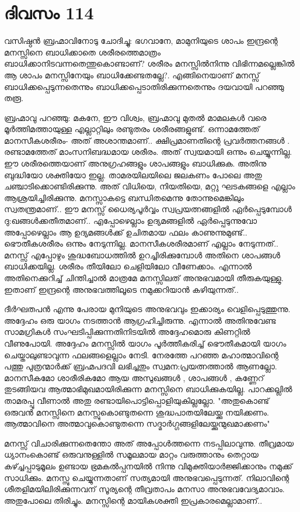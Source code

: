 \newpage
\section{ദിവസം 114}


വസിഷ്ഠന്‍ ബ്രഹ്മാവിനോടു ചോദിച്ചു: ഭഗവാനേ, മാമുനിയുടെ ശാപം ഇന്ദ്രന്റെ മനസ്സിനെ ബാധിക്കാതെ ശരീരത്തെമാത്രം ബാധിക്കാനിടവന്നതെന്തുകൊണ്ടാണ്‌? ശരീരം മനസ്സില്‍നിന്നു വിഭിന്നമല്ലെങ്കില്‍ ആ ശാപം മനസ്സിനേയും ബാധിക്കേണ്ടതല്ലേ?. എങ്ങിനെയാണ്‌ മനസ്സ്‌ ബാധിക്കപ്പെടുന്നതെന്നും ബാധിക്കപ്പെടാതിരിക്കുന്നതെന്നും ദയവായി പറഞ്ഞു തരൂ.

ബ്രഹ്മാവു പറഞ്ഞു: മകനേ, ഈ വിശ്വം, ബ്രഹ്മാവു മുതല്‍ മാമലകള്‍ വരെ മൂര്‍ത്തിമത്തായുള്ള എല്ലാറ്റിലും രണ്ടുതരം ശരീരങ്ങളുണ്ട്‌. ഒന്നാമത്തേത്‌ മാനസീകശരീരം- അത്‌ അശാന്തമാണ്‌.. ക്ഷിപ്രമാണതിന്റെ പ്രവര്‍ത്തനങ്ങള്‍ . രണ്ടാമത്തേത്‌ മാംസനിബദ്ധമായ ശരീരം. അത്‌ സ്വയമായി ഒന്നും ചെയ്യുന്നില്ല. ഈ ശരീരത്തെയാണ്‌ അനുഗ്രഹങ്ങളും ശാപങ്ങളും ബാധിക്കുക. അതിനു ബുദ്ധിയോ ശക്തിയോ ഇല്ല. താമരയിലയിലെ ജലകണം പോലെ അതു ചഞ്ചാടിക്കൊണ്ടിരിക്കുന്നു. അത്‌ വിധിയെ, നിയതിയെ, മറ്റു ഘടകങ്ങളെ എല്ലാം ആശ്രയിച്ചിരിക്കുന്നു. മനസ്സാകട്ടെ ബന്ധിതമെന്നു തോന്നുമെങ്കിലും സ്വതന്ത്രമാണ്‌.. ഈ മനസ്സ്‌ ധൈര്യപൂര്‍വ്വം സ്വപ്രയത്നങ്ങളില്‍ ഏര്‍പ്പെടുമ്പോള്‍ ദു:ഖങ്ങള്‍ക്കതീതമാണ്‌.. എപ്പോഴെല്ലാം ഉദ്യമങ്ങളില്‍ ഏര്‍പ്പെടുന്നുവോ അപ്പോഴെല്ലാം ആ ഉദ്യമങ്ങള്‍ക്ക്‌ ഉചിതമായ ഫലം കാണുന്നുമുണ്ട്‌.. ഭൌതീകശരീരം ഒന്നും നേടുന്നില്ല. മാനസീകശരീരമാണ്‌ എല്ലാം നേടുന്നത്‌.. മനസ്സ്‌ എപ്പോഴും ശുദ്ധബോധത്തില്‍ ഉറച്ചിരിക്കുമ്പോള്‍ അതിനെ ശാപങ്ങള്‍ ബാധിക്കയില്ല. ശരീരം തീയിലോ ചെളിയിലോ വീണേക്കാം. എന്നാല്‍ അതിനെക്കുറിച്ച്‌ ചിന്തിച്ചാല്‍ മാത്രമേ മനസ്സിലത് അനുഭവമായി തീരുകയുള്ളു. ഇതാണ്‌ ഇന്ദ്രന്റെ അനുഭവത്തിലൂടെ നമുക്കറിയാന്‍ കഴിയുന്നത്‌..

ദീര്‍ഘതപന്‍ എന്നു പേരായ മുനിയുടെ അനുഭവവും ഇക്കാര്യം വെളിപ്പെടുത്തുന്നു. അദ്ദേഹം ഒരു യാഗം നടത്താന്‍ ആഗ്രഹിച്ചിരുന്നു. എന്നാല്‍ അതിനുവേണ്ട സാമഗ്രികള്‍ സംഘടിപ്പിക്കുന്നതിനിടയില്‍ അദ്ദേഹമൊരു കിണറ്റില്‍ വീണുപോയി. അദ്ദേഹം മനസ്സില്‍ യാഗം പൂര്‍ത്തീകരിച്ച്‌ ഭൌതീകമായി യാഗം ചെയ്താലുണ്ടാവുന്ന ഫലങ്ങളെല്ലാം നേടി. നേരത്തേ പറഞ്ഞ മഹാത്മാവിന്റെ പത്തു പുത്രന്മാര്‍ക്ക്‌ ബ്രഹ്മപദവി ലഭിച്ചതും സ്വമന:പ്രയത്നത്താല്‍ ആണല്ലോ. മാനസീകമോ ശാരീരികമോ ആയ അസുഖങ്ങള്‍ , ശാപങ്ങള്‍ , കണ്ണേറ്‌  തുടങ്ങിയവ ആത്മാഭിമുഖമായിരിക്കുന്ന മനസ്സിനെ ബാധിക്കുകയില്ല. പാറക്കല്ലില്‍ താമരപ്പൂ വീണാല്‍ അതു രണ്ടായിപൊട്ടിപ്പൊളിയുകില്ലല്ലോ. "അതുകൊണ്ട്‌ ഒരുവന്‍ മനസ്സിനെ മനസ്സുകൊണ്ടുതന്നെ ശുദ്ധപാതയിലേയ്ക്കു നയിക്കണം. ആത്മാവിനെ അത്മാവുകൊണ്ടുതന്നെ സദ്മാര്‍ഗ്ഗങ്ങളിലേയ്ക്കുന്മുഖമാക്കണം"

മനസ്സ്  വിചാരിക്കുന്നതെന്തോ അത്‌ അപ്പോള്‍ത്തന്നെ നടപ്പിലാവുന്നു. തീവ്രമായ ധ്യാനംകൊണ്ട്‌ ഒരുവനുള്ളില്‍ സമൂലമായ മാറ്റം വരുത്താനും തെറ്റായ കഴ്ച്ചപ്പാടുമൂലം ഉണ്ടായ ഭ്രമകല്‍പ്പനയില്‍ നിന്നു വിമുക്തിയാര്‍ജ്ജിക്കാനും നമുക്ക്  സാധിക്കും. മനസ്സു ചെയ്യുന്നതാണ്‌ സത്യമായി അനുഭവപ്പെടുന്നത്‌. നിലാവിന്റെ ശീതളിമയിലിരിക്കുന്നവന്‌ സൂര്യന്റെ തീവ്രതാപം മനസാ അനുഭവവേദ്യമാവാം. അതുപോലെ തിരിച്ചും. മനസ്സിന്റെ മായികശക്തി ഇപ്രകാരമെല്ലാമാണ്‌.. 


